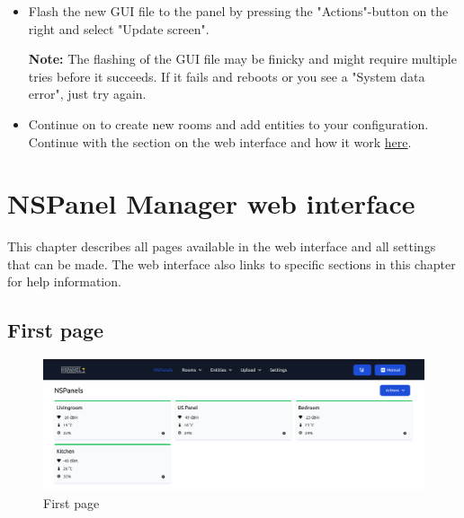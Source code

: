 \documentclass[10pt]{article}
\newcommand{\info}[1]{\begin{infoBox} \textbf{Info:} #1 \end{infoBox}}
\newcommand{\note}[1]{\begin{noteBox} \textbf{Note:} #1 \end{noteBox}}
\begin{document}
\begin{itemize}
      \info{If this is a US NSPanel version then it has to be set in the panel settings. Press the name of the NSPanel in the list and check the "Is US panel"-checkbox.}
      \item Flash the new GUI file to the panel by pressing the "Actions"-button on the right and select "Update screen".
      \note{The flashing of the GUI file may be finicky and might require multiple tries before it succeeds. If it fails and reboots or you see a "System data error", just try again.}
    \item Continue on to create new rooms and add entities to your configuration. Continue with the section on the web interface and how it work \hyperref[sec:nspanelmanager_web_interface]{here}.
    \end{itemize}

    \clearpage
    \section{NSPanel Manager web interface}
    \label{sec:nspanelmanager_web_interface}
    This chapter describes all pages available in the web interface and all settings that can be made. The web interface also links to specific sections in this chapter for help information.
    \subsection{First page}

    \begin{figure}[H]
    \centering
    \includegraphics[width=\textwidth,height=\textheight,keepaspectratio]{index_page.png}
    \caption{First page}%
    \end{figure}
\end{document}
